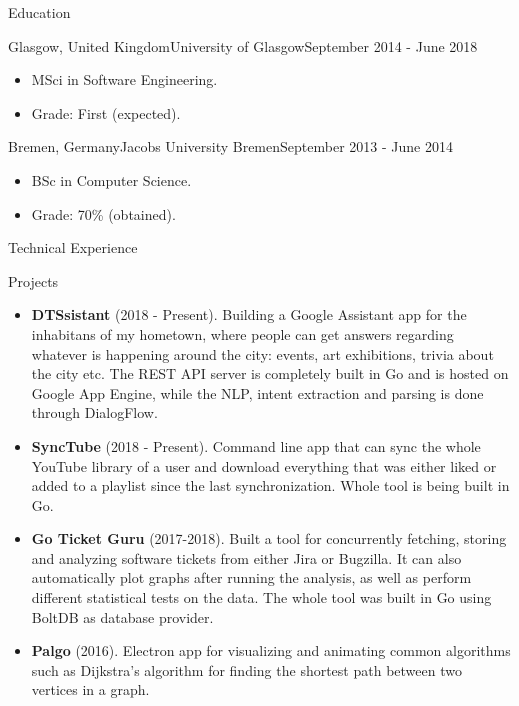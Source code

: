 \documentclass[]{cv}
\begin{document}
	\begin{cvsection}{Education}
		\begin{cvsubsection}{Glasgow, United Kingdom}{University of Glasgow}{September 2014 - June 2018}
			\begin{itemize}
				\item MSci in Software Engineering.
				\item Grade: First (expected).
			\end{itemize}
		\end{cvsubsection}
		\begin{cvsubsection}{Bremen, Germany}{Jacobs University Bremen}{September 2013 - June 2014}
			\begin{itemize}
				\item BSc in Computer Science.
				\item Grade: 70\% (obtained).
			\end{itemize}
		\end{cvsubsection}

	\end{cvsection}
	
	\begin{cvsection}{Technical Experience}
		\begin{cvsubsection}{Projects}{}{}
			\begin{itemize}
				\item \textbf{DTSsistant} (2018 - Present). Building a Google Assistant app for the inhabitans of my hometown, 
				where people can get answers regarding whatever is happening around the city: 
				events, art exhibitions, trivia about the city etc.
				The REST API server is completely built in Go and is hosted on Google App Engine, while the NLP,
				intent extraction and parsing is done through DialogFlow.
				\item \textbf{SyncTube} (2018 - Present). Command line app that can sync the whole YouTube library of a user and download everything that was 
				either liked or added to a playlist since the last synchronization. Whole tool is being built in Go.
				\item \textbf{Go Ticket Guru} (2017-2018). Built a tool for concurrently fetching, storing and analyzing software tickets from 
				either Jira or Bugzilla. It can also automatically plot graphs after running the analysis, as well as perform different 
				statistical tests on the data. The whole tool was built in Go using BoltDB as database provider.
				\item \textbf{Palgo} (2016).  Electron app for visualizing and animating common algorithms such as Dijkstra’s algorithm for finding the 
				shortest path between two vertices in a graph.
			\end{itemize}
		\end{cvsubsection}
	\end{cvsection}
	
\end{document}
